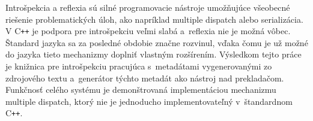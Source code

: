 \documentclass[12pt]{report}
\newcommand{\Cpp}{C\texttt{++}}
\begin{document}

Introšpekcia a reflexia sú silné programovacie nástroje umožňujúce všeobecné riešenie problematických úloh, ako napríklad multiple dispatch alebo serializácia. V \Cpp{} je podpora pre introšpekciu veľmi slabá a~reflexia nie je možná vôbec. Štandard jazyka sa za posledné obdobie značne rozvinul, vďaka čomu je už možné do jazyka tieto mechanizmy doplniť vlastným rozšírením. Výsledkom tejto práce je knižnica pre introšpekciu pracujúca s~metadátami vygenerovanými zo zdrojového textu a~generátor týchto metadát ako nástroj nad prekladačom. Funkčnosť celého systému je demonštrovaná implementáciou mechanizmu multiple dispatch, ktorý nie je jednoducho implementovateľný v~štandardnom \Cpp{}.
\end{document}
